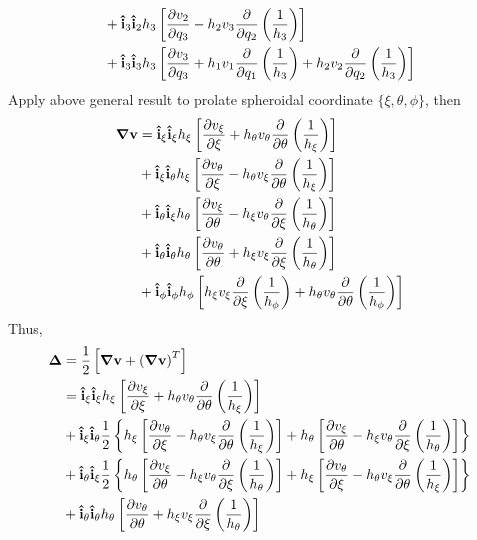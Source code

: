 \documentclass[fontsize=11pt, %
                             paper=a4, %
                             twoside, %
                             captions=tableheading,
                             index=totoc,
                             hyperref]{labbook}
\begin{document}
\begin{addmargin}[4cm]{0cm}
\begin{equation}
\begin{aligned}
&+\mathbf{\hat{i}}_3 \mathbf{\hat{i}}_2 h_3\left[\frac{\partial v_2}{\partial q_3}-h_2v_3\frac{\partial }{\partial q_2}\left(\frac{1}{h_3}\right)\right]\\
&+\mathbf{\hat{i}}_3 \mathbf{\hat{i}}_3 h_3\left[\frac{\partial v_3}{\partial q_3}+h_1v_1\frac{\partial }{\partial q_1}\left(\frac{1}{h_3}\right)+h_2v_2\frac{\partial }{\partial q_2}\left(\frac{1}{h_3}\right)\right]
\end{aligned}
\end{equation}
Apply above general result to prolate spheroidal coordinate $\{\xi,\theta,\phi\}$, then
\begin{equation}
\begin{aligned}
\mbox{\boldmath$ \nabla $} \mathbf{v}&=\mathbf{\hat{i}}_\xi \mathbf{\hat{i}}_\xi h_\xi\left[\frac{\partial v_\xi}{\partial \xi}+h_\theta v_\theta \frac{\partial }{\partial \theta}\left(\frac{1}{h_\xi}\right)\right]\\
&+\mathbf{\hat{i}}_\xi \mathbf{\hat{i}}_\theta h_\xi \left[\frac{\partial v_\theta}{\partial \xi}-h_\theta v_\xi \frac{\partial }{\partial \theta}\left(\frac{1}{h_\xi}\right)\right]\\
&+\mathbf{\hat{i}}_\theta \mathbf{\hat{i}}_\xi h_\theta \left[\frac{\partial v_\xi}{\partial \theta}-h_\xi v_\theta \frac{\partial }{\partial \xi}\left(\frac{1}{h_\theta}\right)\right]\\
&+\mathbf{\hat{i}}_\theta \mathbf{\hat{i}}_\theta h_\theta \left[\frac{\partial v_\theta}{\partial \theta}+h_\xi v_\xi \frac{\partial }{\partial \xi}\left(\frac{1}{h_\theta}\right)\right]\\
&+\mathbf{\hat{i}}_\phi \mathbf{\hat{i}}_\phi h_\phi \left[h_\xi v_\xi \frac{\partial }{\partial \xi}\left(\frac{1}{h_\phi}\right)+h_\theta v_\theta\frac{\partial }{\partial \theta}\left(\frac{1}{h_\phi}\right)\right]
\end{aligned}
\end{equation}
Thus,
\begin{equation}
\begin{aligned}
\gv \Delta&=\frac{1}{2}\left[\grad{\v v} + \left(\grad{\v v}\right)^T\right]\\
&=\uv i_\xi \uv i_\xi h_\xi \left[\pd{v_\xi}{\xi}+h_\theta v_\theta \pd{}{\theta}\left(\frac{1}{h_\xi}\right)\right]\\
&+\uv i_\xi \uv i_\theta \frac{1}{2}\left\{h_\xi\left[\pd{v_\theta}{\xi}-h_\theta v_\xi \pd{}{\theta}\left(\frac{1}{h_\xi}\right)\right]+h_\theta\left[\pd{v_\xi}{\theta}-h_\xi v_\theta \pd{}{\xi}\left(\frac{1}{h_\theta}\right)\right]\right\}\\
&+\uv i_\theta \uv i_\xi \frac{1}{2}\left\{h_\theta\left[\pd{v_\xi}{\theta}-h_\xi v_\theta \pd{}{\xi}\left(\frac{1}{h_\theta}\right)\right]+h_\xi \left[\pd{v_\theta}{\xi}-h_\theta v_\xi \pd{}{\theta}\left(\frac{1}{h_\xi}\right)\right]\right\}\\
&+\uv i_\theta \uv i_\theta h_\theta \left[\pd{v_\theta}{\theta}+h_\xi v_\xi \pd{}{\xi}\left(\frac{1}{h_\theta}\right)\right]\\

\end{aligned}
\end{equation}
\end{addmargin}
\end{document}
